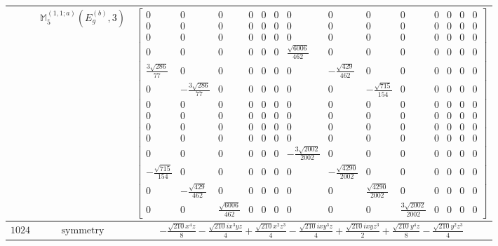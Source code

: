 \documentclass[fleqn,8pt,landscape]{jsarticle}
\begin{document}
\begin{longtable}{ccc}
$  $ & $ \mathbb{M}_{5}^{(1,1;a)}(E_{g}^{(b)},3) $ & $ \begin{bmatrix} 0 & 0 & 0 & 0 & 0 & 0 & 0 & 0 & 0 & 0 & 0 & 0 & 0 & 0 \\ 0 & 0 & 0 & 0 & 0 & 0 & 0 & 0 & 0 & 0 & 0 & 0 & 0 & 0 \\ 0 & 0 & 0 & 0 & 0 & 0 & 0 & 0 & 0 & 0 & 0 & 0 & 0 & 0 \\ 0 & 0 & 0 & 0 & 0 & 0 & \frac{\sqrt{6006}}{462} & 0 & 0 & 0 & 0 & 0 & 0 & 0 \\ \frac{3 \sqrt{286}}{77} & 0 & 0 & 0 & 0 & 0 & 0 & - \frac{\sqrt{429}}{462} & 0 & 0 & 0 & 0 & 0 & 0 \\ 0 & - \frac{3 \sqrt{286}}{77} & 0 & 0 & 0 & 0 & 0 & 0 & - \frac{\sqrt{715}}{154} & 0 & 0 & 0 & 0 & 0 \\ 0 & 0 & 0 & 0 & 0 & 0 & 0 & 0 & 0 & 0 & 0 & 0 & 0 & 0 \\ 0 & 0 & 0 & 0 & 0 & 0 & 0 & 0 & 0 & 0 & 0 & 0 & 0 & 0 \\ 0 & 0 & 0 & 0 & 0 & 0 & 0 & 0 & 0 & 0 & 0 & 0 & 0 & 0 \\ 0 & 0 & 0 & 0 & 0 & 0 & 0 & 0 & 0 & 0 & 0 & 0 & 0 & 0 \\ 0 & 0 & 0 & 0 & 0 & 0 & - \frac{3 \sqrt{2002}}{2002} & 0 & 0 & 0 & 0 & 0 & 0 & 0 \\ - \frac{\sqrt{715}}{154} & 0 & 0 & 0 & 0 & 0 & 0 & - \frac{\sqrt{4290}}{2002} & 0 & 0 & 0 & 0 & 0 & 0 \\ 0 & - \frac{\sqrt{429}}{462} & 0 & 0 & 0 & 0 & 0 & 0 & \frac{\sqrt{4290}}{2002} & 0 & 0 & 0 & 0 & 0 \\ 0 & 0 & \frac{\sqrt{6006}}{462} & 0 & 0 & 0 & 0 & 0 & 0 & \frac{3 \sqrt{2002}}{2002} & 0 & 0 & 0 & 0 \end{bmatrix} $ \\ \hline
$ 1024 $ & $ \text{symmetry} $ & $ - \frac{\sqrt{210} x^{4} z}{8} - \frac{\sqrt{210} i x^{3} y z}{4} + \frac{\sqrt{210} x^{2} z^{3}}{4} - \frac{\sqrt{210} i x y^{3} z}{4} + \frac{\sqrt{210} i x y z^{3}}{2} + \frac{\sqrt{210} y^{4} z}{8} - \frac{\sqrt{210} y^{2} z^{3}}{4} $ \\

\end{longtable}
\end{document}
